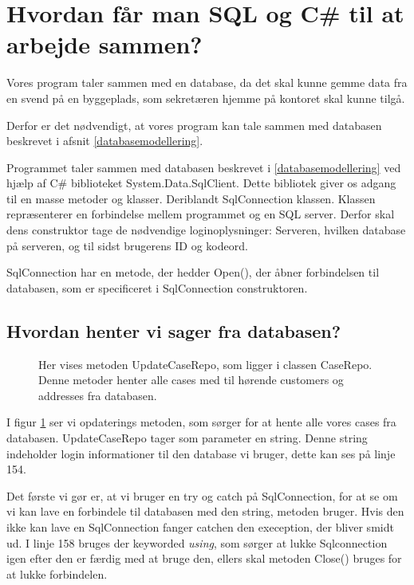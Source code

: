 \section{Hvordan får man SQL og C\# til at arbejde sammen?}

Vores program taler sammen med en database, da det skal kunne gemme data fra en svend på en byggeplads, som sekretæren hjemme på kontoret skal kunne tilgå.

Derfor er det nødvendigt, at vores program kan tale sammen med databasen beskrevet i afsnit \ref{databasemodellering}.

Programmet taler sammen med databasen beskrevet i \ref{databasemodellering} ved hjælp af C\# biblioteket System.Data.SqlClient.\cite{sqlclient}
Dette bibliotek giver os adgang til en masse metoder og klasser. Deriblandt SqlConnection klassen.
Klassen repræsenterer en forbindelse mellem programmet og en SQL server.
Derfor skal dens construktor tage de nødvendige loginoplysninger: Serveren, hvilken database på serveren, og til sidst brugerens ID og kodeord.

SqlConnection har en metode, der hedder Open(), der åbner forbindelsen til databasen, som er specificeret i SqlConnection construktoren.

\subsection{Hvordan henter vi sager fra databasen?}

\begin{figure}[H]
    \caption{Her vises metoden UpdateCaseRepo, som ligger i classen CaseRepo. Denne metoder henter alle cases med til hørende customers og addresses fra databasen.}
    \label{fig:UpdateCaseRepo}
\end{figure}

I figur \ref{fig:UpdateCaseRepo} ser vi opdaterings metoden, som sørger for at hente alle vores cases fra databasen.
UpdateCaseRepo tager som parameter en string.
Denne string indeholder login informationer til den database vi bruger, dette kan ses på linje 154.

Det første vi gør er, at vi bruger en try og catch på SqlConnection, for at se om vi kan lave en forbindele til databasen med den string, metoden bruger.
Hvis den ikke kan lave en SqlConnection fanger catchen den exeception, der bliver smidt ud.
I linje 158 bruges der keyworded \textit{using}, som sørger at lukke Sqlconnection igen efter den er færdig med at bruge den, ellers skal metoden Close() bruges for at lukke forbindelen.

